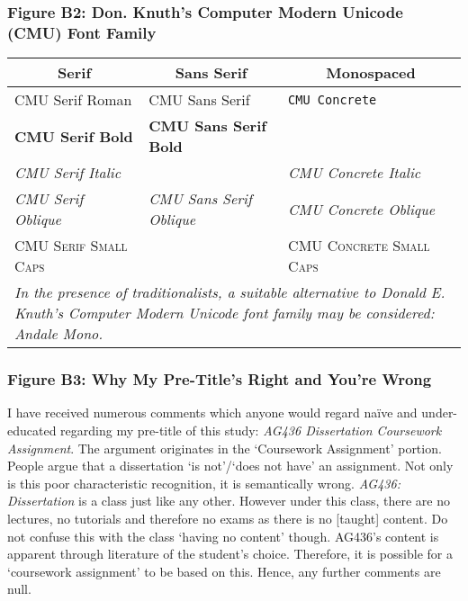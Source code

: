 \documentclass[11pt, english]{article}
\begin{document}
		\subsubsection*{Figure B2: Don. Knuth's Computer Modern Unicode (CMU) Font Family}

		\begin{table}[h]
			\scriptsize
			\renewcommand{\arraystretch}{1.25}
		\begin{center}
			\begin{tabular}{p{4cm}p{4cm}p{4cm}}
			\hline
			\multicolumn{1}{c}{\textbf{Serif}} & \multicolumn{1}{c}{\textbf{Sans Serif}} & \multicolumn{1}{c}{\textbf{Monospaced}}\\
			\hline
			CMU Serif Roman & \textsf{CMU Sans Serif} & \texttt{CMU Concrete}\\
			\textbf{CMU Serif Bold} & \sffamily \textbf{CMU Sans Serif Bold} & \\ 
				\textit{CMU Serif Italic} & & \ttfamily \textit{CMU Concrete Italic}\\
			\textsl{CMU Serif Oblique} & \sffamily \textsl{CMU Sans Serif Oblique} & \ttfamily \textsl{CMU Concrete Oblique}\\
				\textsc{CMU Serif Small Caps} & & \ttfamily \textsc{CMU Concrete Small Caps}\\
			\hline
				\multicolumn{3}{p{13cm}}{\textit{In the presence of traditionalists, a suitable alternative to Donald E. Knuth's Computer Modern Unicode font family may be considered: Andale Mono.}}\\
			\hline
		\end{tabular}
		\end{center}
		\end{table}

		\subsubsection*{Figure B3: Why My Pre-Title’s Right and You’re Wrong}

		I have received numerous comments which anyone would regard na\"{i}ve and under-educated regarding my pre-title of this study: \textit{AG436 Dissertation Coursework Assignment}. The argument originates in the `Coursework Assignment’ portion. People argue that a dissertation `is not’/`does not have’ an assignment. Not only is this poor characteristic recognition, it is semantically wrong. \textit{AG436: Dissertation} is a class just like any other. However under this class, there are no lectures, no tutorials and therefore no exams as there is no [taught] content. Do not confuse this with the class `having no content’ though. AG436’s content is apparent through literature of the student’s choice. Therefore, it is possible for a `coursework assignment’ to be based on this. Hence, any further comments are null.
\end{document}
